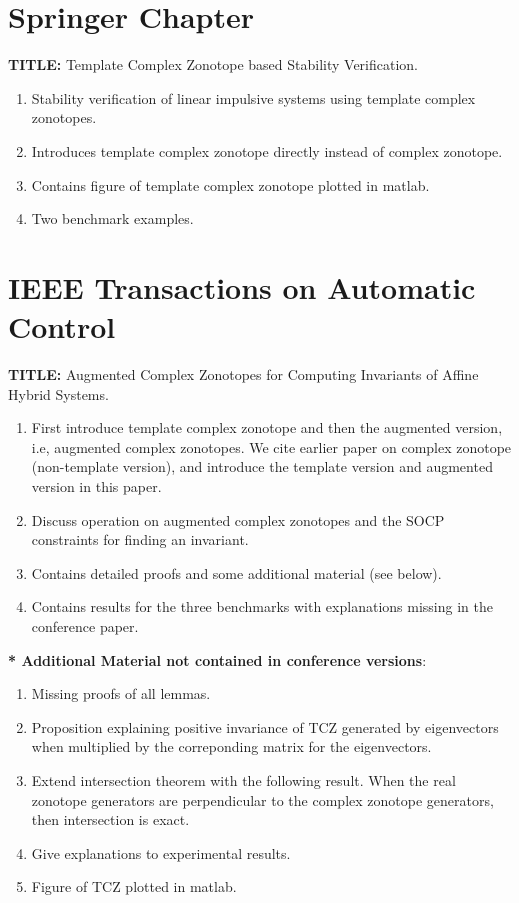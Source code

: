 \documentclass{report}
\begin{document}
\section{Springer Chapter}

\textbf{TITLE:} Template Complex Zonotope based Stability Verification.


\begin{enumerate}
\item Stability verification of linear impulsive systems using template complex zonotopes.
\item Introduces template complex zonotope directly instead of complex zonotope.
\item Contains figure of template complex zonotope plotted in matlab.
\item Two benchmark examples.
\end{enumerate}


\section{IEEE Transactions on Automatic Control}

\textbf{TITLE:} Augmented Complex Zonotopes for Computing Invariants of Affine Hybrid Systems.

\begin{enumerate}
\item First introduce template complex zonotope and then the augmented
  version, i.e, augmented complex zonotopes.  We cite earlier paper on
  complex zonotope (non-template version), and introduce the template
  version and augmented version in this paper.
\item Discuss operation on augmented complex zonotopes and the SOCP constraints for finding an invariant.
\item Contains detailed proofs and some additional material (see below).
\item Contains results for the three benchmarks with explanations missing in the conference paper.
\end{enumerate}

\textbf{* Additional Material not contained in conference versions}:
\begin{enumerate}
\item Missing proofs of all lemmas.
\item Proposition explaining positive invariance of TCZ generated by eigenvectors when multiplied by the correponding matrix for the eigenvectors.
\item Extend intersection theorem with the following result.  When the real zonotope generators are perpendicular to the complex zonotope generators, then intersection is exact.
\item Give explanations to experimental results.
\item Figure of TCZ plotted in matlab.
\end{enumerate}
\end{document}
